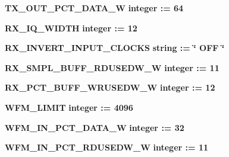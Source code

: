 \begin{DoxyCompactItemize}
\item 
{\bf T\+X\+\_\+\+O\+U\+T\+\_\+\+P\+C\+T\+\_\+\+D\+A\+T\+A\+\_\+W} {\bfseries {\bfseries \textcolor{comment}{integer}\textcolor{vhdlchar}{ }\textcolor{vhdlchar}{ }\textcolor{vhdlchar}{\+:}\textcolor{vhdlchar}{=}\textcolor{vhdlchar}{ }\textcolor{vhdlchar}{ } \textcolor{vhdldigit}{64} \textcolor{vhdlchar}{ }}}
\item 
{\bf R\+X\+\_\+\+I\+Q\+\_\+\+W\+I\+D\+TH} {\bfseries {\bfseries \textcolor{comment}{integer}\textcolor{vhdlchar}{ }\textcolor{vhdlchar}{ }\textcolor{vhdlchar}{\+:}\textcolor{vhdlchar}{=}\textcolor{vhdlchar}{ }\textcolor{vhdlchar}{ } \textcolor{vhdldigit}{12} \textcolor{vhdlchar}{ }}}
\item 
{\bf R\+X\+\_\+\+I\+N\+V\+E\+R\+T\+\_\+\+I\+N\+P\+U\+T\+\_\+\+C\+L\+O\+C\+KS} {\bfseries {\bfseries \textcolor{comment}{string}\textcolor{vhdlchar}{ }\textcolor{vhdlchar}{ }\textcolor{vhdlchar}{\+:}\textcolor{vhdlchar}{=}\textcolor{vhdlchar}{ }\textcolor{vhdlchar}{ }\textcolor{vhdlchar}{ }\textcolor{vhdlchar}{ }\textcolor{keyword}{\char`\"{} O\+F\+F \char`\"{}}\textcolor{vhdlchar}{ }}}
\item 
{\bf R\+X\+\_\+\+S\+M\+P\+L\+\_\+\+B\+U\+F\+F\+\_\+\+R\+D\+U\+S\+E\+D\+W\+\_\+W} {\bfseries {\bfseries \textcolor{comment}{integer}\textcolor{vhdlchar}{ }\textcolor{vhdlchar}{ }\textcolor{vhdlchar}{\+:}\textcolor{vhdlchar}{=}\textcolor{vhdlchar}{ }\textcolor{vhdlchar}{ } \textcolor{vhdldigit}{11} \textcolor{vhdlchar}{ }}}
\item 
{\bf R\+X\+\_\+\+P\+C\+T\+\_\+\+B\+U\+F\+F\+\_\+\+W\+R\+U\+S\+E\+D\+W\+\_\+W} {\bfseries {\bfseries \textcolor{comment}{integer}\textcolor{vhdlchar}{ }\textcolor{vhdlchar}{ }\textcolor{vhdlchar}{\+:}\textcolor{vhdlchar}{=}\textcolor{vhdlchar}{ }\textcolor{vhdlchar}{ } \textcolor{vhdldigit}{12} \textcolor{vhdlchar}{ }}}
\item 
{\bf W\+F\+M\+\_\+\+L\+I\+M\+IT} {\bfseries {\bfseries \textcolor{comment}{integer}\textcolor{vhdlchar}{ }\textcolor{vhdlchar}{ }\textcolor{vhdlchar}{\+:}\textcolor{vhdlchar}{=}\textcolor{vhdlchar}{ }\textcolor{vhdlchar}{ } \textcolor{vhdldigit}{4096} \textcolor{vhdlchar}{ }}}
\item 
{\bf W\+F\+M\+\_\+\+I\+N\+\_\+\+P\+C\+T\+\_\+\+D\+A\+T\+A\+\_\+W} {\bfseries {\bfseries \textcolor{comment}{integer}\textcolor{vhdlchar}{ }\textcolor{vhdlchar}{ }\textcolor{vhdlchar}{\+:}\textcolor{vhdlchar}{=}\textcolor{vhdlchar}{ }\textcolor{vhdlchar}{ } \textcolor{vhdldigit}{32} \textcolor{vhdlchar}{ }}}
\item 
{\bf W\+F\+M\+\_\+\+I\+N\+\_\+\+P\+C\+T\+\_\+\+R\+D\+U\+S\+E\+D\+W\+\_\+W} {\bfseries {\bfseries \textcolor{comment}{integer}\textcolor{vhdlchar}{ }\textcolor{vhdlchar}{ }\textcolor{vhdlchar}{\+:}\textcolor{vhdlchar}{=}\textcolor{vhdlchar}{ }\textcolor{vhdlchar}{ } \textcolor{vhdldigit}{11} \textcolor{vhdlchar}{ }}}

\end{DoxyCompactItemize}
